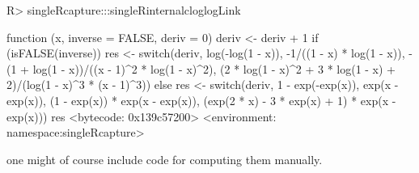 \documentclass[
]{jss}
\newcommand{\1}{\mathcal{I}} \newcommand{\bZero}{\boldsymbol{0}}
\begin{document}
\begin{CodeChunk}
\begin{CodeInput}
R> singleRcapture:::singleRinternalcloglogLink
\end{CodeInput}
\begin{CodeOutput}
function (x, inverse = FALSE, deriv = 0) 
{
    deriv <- deriv + 1
    if (isFALSE(inverse)) {
        res <- switch(deriv, log(-log(1 - x)), -1/((1 - x) * 
            log(1 - x)), -(1 + log(1 - x))/((x - 1)^2 * log(1 - 
            x)^2), (2 * log(1 - x)^2 + 3 * log(1 - x) + 2)/(log(1 - 
            x)^3 * (x - 1)^3))
    }
    else {
        res <- switch(deriv, 1 - exp(-exp(x)), exp(x - exp(x)), 
            (1 - exp(x)) * exp(x - exp(x)), (exp(2 * x) - 3 * 
                exp(x) + 1) * exp(x - exp(x)))
    }
    res
}
<bytecode: 0x139c57200>
<environment: namespace:singleRcapture>
\end{CodeOutput}
\end{CodeChunk}

\normalsize

one might of course include code for computing them manually.


\end{document}

